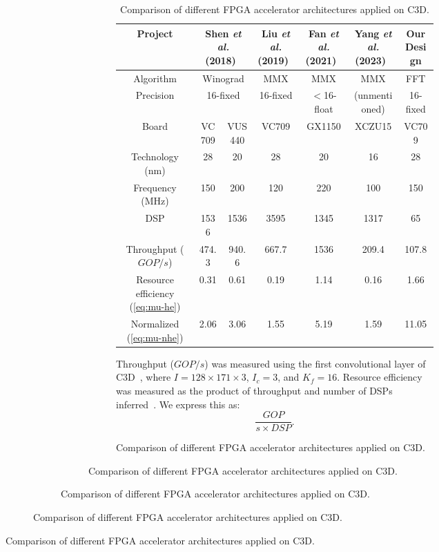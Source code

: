 \begin{figure}[!tb]
\begin{figure}[!tb]
\begin{figure}[!tb]
\begin{figure}[!tb]
\begin{figure}[!tb]
\begin{table}[!tb]
  \ifCLASSOPTIONcompsoc
    \begin{table}[!tb]
  \else
    \begin{table}[!t]
  \fi
    \caption{Comparison of different FPGA accelerator architectures applied on C3D.}
    \centering
    \label{tab:he-comp}
    \begin{tabular}{|c|c|c|c|c|c|c|}
      \hline
      Project &
        \multicolumn{2}{c|}{Shen \textit{et al.} (2018)~\cite{shen2018towards}} &
        Liu \textit{et al.} (2019)~\cite{liu2019uniform} &
        Fan \textit{et al.} (2021)~\cite{fan2021high} &
        Yang \textit{et al.} (2023)~\cite{yang2023fgpa} &
        Our Design\\\hline
      Algorithm    & \multicolumn{2}{c|}{Winograd} & MMX      & MMX         & MMX    & FFT    \\\hline
      Precision    & \multicolumn{2}{c|}{16-fixed} & 16-fixed & $<$16-float & (unmentioned)   & 16-fixed \\\hline
      Board                       & VC709 & VUS440 & VC709    & GX1150      & XCZU15 & VC709  \\\hline
      Technology (nm)             & 28    & 20     & 28       & 20          & 16     & 28     \\\hline
      Frequency (MHz)             & 150   & 200    & 120      & 220         & 100    & 150    \\\hline
      DSP                         & 1536  & 1536   & 3595     & 1345        & 1317   & 65     \\\hline
      Throughput ($GOP/s$)        & 474.3 & 940.6  & 667.7    & 1536        & 209.4  & 107.8  \\\hline
      Resource efficiency (\ref{eq:mu-he})
        &                           0.31  & 0.61   & 0.19     & 1.14        & 0.16   & 1.66   \\
      Normalized (\ref{eq:mu-nhe})
        &                           2.06  & 3.06   & 1.55     & 5.19        & 1.59   & 11.05  \\\hline
    \end{tabular}
  \end{table}

  Throughput ($GOP/s$) was measured using the first convolutional layer of C3D~\cite{tran2015learning}, where $I=128{\times}171{\times}3$, $I_c=3$, and $K_f=16$. Resource efficiency was measured as the product of throughput and number of DSPs inferred~\cite{fan2021high,li2022hardware,kyriakos2022resources,jiang2025fpga}. We express this as:
  \begin{equation}\label{eq:mu-he}
    \frac{GOP}{s{\times}DSP}.
  \end{equation}


\end{table}
\end{table}
\end{figure}
\end{figure}
\end{figure}
\end{figure}
\end{figure}
